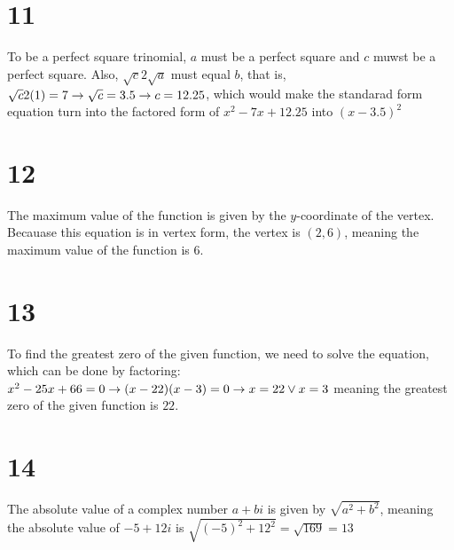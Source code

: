\documentclass{article}
\theoremstyle{definition}
\begin{document}
\section*{11}
To be a perfect square trinomial, $a$ must be a perfect square and $c$ muwst be a perfect square. Also, $\sqrt{c}2\sqrt{a}$ must equal $b$, that is, 
$\sqrt{c}2(1)=7\newline\rightarrow 
\sqrt{c}=3.5\newline\rightarrow 
c=12.25$, which would make the standarad form equation turn into the factored form of $x^2-7x+12.25$ into $(x-3.5)^2$

\section*{12}
The maximum value of the function is given by the $y$-coordinate of the vertex. Becauase this equation is in vertex form, the vertex is 
$(2,6)$, meaning the maximum value of the function is $6$.

\section*{13}
To find the greatest zero of the given function, we need to solve the equation, which can be done by factoring:\newline
$x^2-25x+66=0\newline\rightarrow 
(x-22)(x-3)=0\newline\rightarrow 
x=22\vee x=3\newline$ meaning the greatest zero of the given function is $22$.

\section*{14}
The absolute value of a complex number $a+bi$ is given by $\sqrt{a^2+b^2}$, meaning the absolute value of $-5+12i$ is $\sqrt{(-5)^2+12^2}=\sqrt{169}=13$
\end{document}
